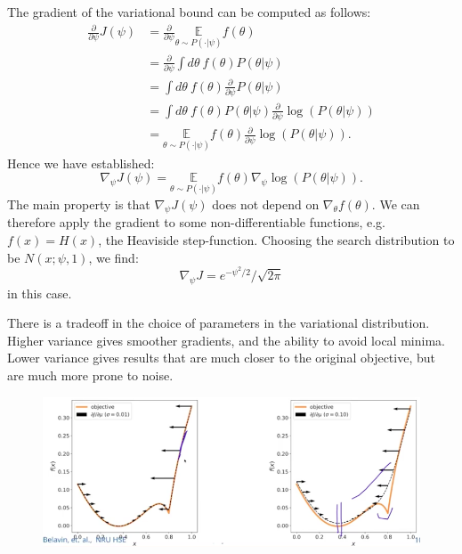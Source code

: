 The gradient of the variational bound can be computed as follows:
\begin{align*}
\frac{\partial}{\partial \psi} J(\psi) &= \frac{\partial}{\partial \psi} \underset{\theta \sim P(\cdot | \psi)}{\mathbb{E}} f(\theta)\\[1.5ex]
&= \frac{\partial}{\partial \psi} \int d\theta\ f(\theta) P(\theta | \psi)\\[1.5ex]
&= \int d\theta\ f(\theta) \frac{\partial}{\partial \psi} P(\theta | \psi)\\[1.5ex]
&= \int d\theta\ f(\theta) P(\theta | \psi) \frac{\partial}{\partial \psi} \log(P(\theta | \psi))\\[1.5ex]
&=  \underset{\theta \sim P(\cdot | \psi)}{\mathbb{E}} f(\theta) \frac{\partial}{\partial \psi} \log(P(\theta | \psi)).
\end{align*}
Hence we have established:
\begin{equation*}
\nabla_{\psi} J(\psi) = \underset{\theta \sim P(\cdot | \psi)}{\mathbb{E}} f(\theta) \nabla_{\psi} \log(P(\theta | \psi)).
\end{equation*}
The main property is that $\nabla_{\psi} J(\psi)$ does not depend on $\nabla_{\theta} f(\theta)$. We can therefore apply the gradient to some non-differentiable functions, e.g. $f(x) = H(x)$, the Heaviside step-function. Choosing the search distribution to be $N(x; \psi, 1)$, we find:
\begin{equation*}
\nabla_{\psi} J = e^{-\psi^2/2}/\sqrt{2\pi}
\end{equation*}
in this case.

\minirule

There is a tradeoff in the choice of parameters in the variational distribution. Higher variance gives smoother gradients, and the ability to avoid local minima. Lower variance gives results that are much closer to the original objective, but are much more prone to noise.

\begin{figure}[H]
\centering
\includegraphics[scale=0.4]{variationalboundtradeoff.png}
\end{figure}

